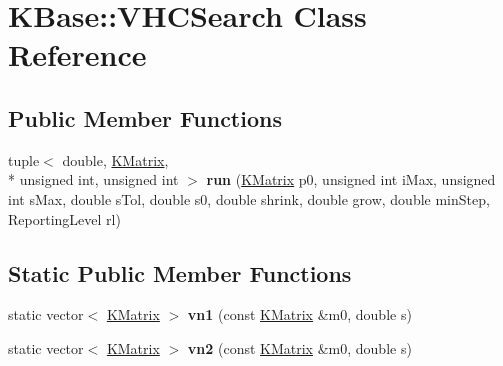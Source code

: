 \hypertarget{class_k_base_1_1_v_h_c_search}{\section{K\-Base\-:\-:V\-H\-C\-Search Class Reference}
\label{class_k_base_1_1_v_h_c_search}
}
\subsection*{Public Member Functions}
\begin{DoxyCompactItemize}
\item 
\hypertarget{class_k_base_1_1_v_h_c_search_a27cd0d24dd198727288211eeda5b22b3}{tuple$<$ double, \hyperlink{class_k_base_1_1_k_matrix}{K\-Matrix}, \\*
unsigned int, unsigned int $>$ {\bfseries run} (\hyperlink{class_k_base_1_1_k_matrix}{K\-Matrix} p0, unsigned int i\-Max, unsigned int s\-Max, double s\-Tol, double s0, double shrink, double grow, double min\-Step, Reporting\-Level rl)}\label{class_k_base_1_1_v_h_c_search_a27cd0d24dd198727288211eeda5b22b3}

\end{DoxyCompactItemize}
\subsection*{Static Public Member Functions}
\begin{DoxyCompactItemize}
\item 
\hypertarget{class_k_base_1_1_v_h_c_search_a7a5a28c62b400f8dedaedeb64a4a2c69}{static vector$<$ \hyperlink{class_k_base_1_1_k_matrix}{K\-Matrix} $>$ {\bfseries vn1} (const \hyperlink{class_k_base_1_1_k_matrix}{K\-Matrix} \&m0, double s)}\label{class_k_base_1_1_v_h_c_search_a7a5a28c62b400f8dedaedeb64a4a2c69}

\item 
\hypertarget{class_k_base_1_1_v_h_c_search_a5bb7ee63beefb06208451d32f57b4079}{static vector$<$ \hyperlink{class_k_base_1_1_k_matrix}{K\-Matrix} $>$ {\bfseries vn2} (const \hyperlink{class_k_base_1_1_k_matrix}{K\-Matrix} \&m0, double s)}\label{class_k_base_1_1_v_h_c_search_a5bb7ee63beefb06208451d32f57b4079}

\end{DoxyCompactItemize}
